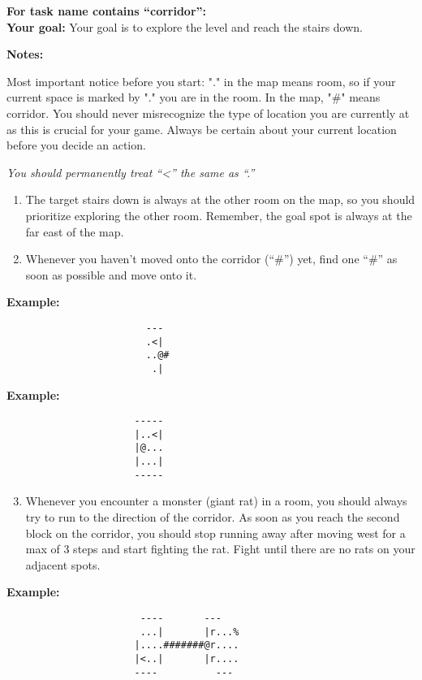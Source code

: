 \begin{MyGreenBox}[frametitle={\textbf{Iteration 2 MiniHack Prompt}}]
\textbf{For task name contains “corridor”:}\\
\textbf{Your goal:} Your goal is to explore the level and reach the stairs down.

\textbf{Notes:}

Most important notice before you start: "." in the map means room, so if your current space is marked by "." you are in the room. In the map, "\#" means corridor. You should never misrecognize the type of location you are currently at as this is crucial for your game. Always be certain about your current location before you decide an action.

\textit{You should permanently treat “<” the same as “.”}

\begin{enumerate}
  \item The target stairs down is always at the other room on the map, so you should prioritize exploring the other room. Remember, the goal spot is always at the far east of the map.
  \item Whenever you haven’t moved onto the corridor (“\#”) yet, find one “\#” as soon as possible and move onto it.
\end{enumerate}

\textbf{Example:}
\begin{verbatim}
                        ---
                        .<|
                        ..@#
                         .|
\end{verbatim}

\textbf{Example:}
\begin{verbatim}
                      -----
                      |..<|
                      |@...
                      |...|
                      -----
\end{verbatim}

\begin{enumerate}\setcounter{enumi}{2}
  \item Whenever you encounter a monster (giant rat) in a room, you should always try to run to the direction of the corridor. As soon as you reach the second block on the corridor, you should stop running away after moving west for a max of 3 steps and start fighting the rat. Fight until there are no rats on your adjacent spots.
\end{enumerate}

\textbf{Example:}
\begin{verbatim}
                       ----       ---
                       ...|       |r...%
                      |....#######@r....
                      |<..|       |r....
                      ----          ---
\end{verbatim}


\end{MyGreenBox}
